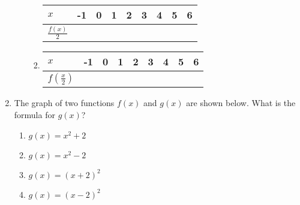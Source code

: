 \documentclass[11pt]{article}
\begin{document}
\begin{enumerate}
\begin{multicols}{2}
\begin{enumerate}
\begin{enumerate}
\begin{tabular}{|l|l|l|l|l|l|l|l|l|}
\hline
$x$    & -1 & 0 & 1 & 2 & 3 & 4 & 5 & 6 \\ \hline
$\displaystyle \frac{f(x)}{2}$ &    &   &   &   &   &   &   &   \\ \hline
\end{tabular}
\item 

\begin{tabular}{|l|l|l|l|l|l|l|l|l|}
\hline
$x$    & -1 & 0 & 1 & 2 & 3 & 4 & 5 & 6 \\ \hline
$\displaystyle f\left (\frac{x}{2}\right )$ &    &   &   &   &   &   &   &   \\ \hline
\end{tabular}
\end{enumerate}

\end{enumerate}
\end{multicols}


\item The graph of two functions $f(x)$ and $g(x)$ are shown below. What is the formula for $g(x)$?

\begin{minipage}[t]{0.5\linewidth}
\end{minipage}%
\begin{minipage}[b]{0.5\linewidth}
\begin{enumerate}
\item $g(x)=x^2+2$
\item $g(x)=x^2-2$
\item $g(x)=(x+2)^2$
\item $g(x)=(x-2)^2$
\end{enumerate}
\end{minipage}



\end{enumerate}
\end{document}
